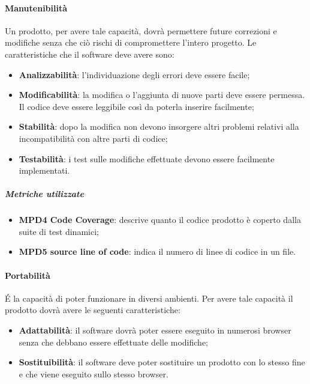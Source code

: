 \paragraph{Manutenibilità}
Un prodotto, per avere tale capacità, dovrà permettere future correzioni e modifiche senza che ciò rischi di compromettere l'intero progetto. Le caratteristiche che il software deve avere sono:
\begin{itemize}
\item \textbf{Analizzabilità}: l'individuazione degli errori deve essere facile;
\item \textbf{Modificabilità}: la modifica o l'aggiunta di nuove parti deve essere permessa. Il codice deve essere leggibile così da poterla inserire facilmente;
\item \textbf{Stabilità}: dopo la modifica non devono insorgere altri problemi relativi alla incompatibilità con altre parti di codice;
\item \textbf{Testabilità}: i test sulle modifiche effettuate devono essere facilmente implementati.
\end{itemize}
\subparagraph{Metriche utilizzate}
\begin{itemize}
\item \textbf{MPD4 Code Coverage}: descrive quanto il codice prodotto è coperto dalla suite di test dinamici;
\item \textbf{MPD5 source line of code}: indica il numero di linee di codice in un file. 
\end{itemize}
\paragraph{Portabilità}
\'E la capacità di poter funzionare in diversi ambienti. Per avere tale capacità il prodotto dovrà avere le seguenti caratteristiche:
\begin{itemize}
\item \textbf{Adattabilità}: il software dovrà poter essere eseguito in numerosi browser senza che debbano essere effettuate delle modifiche;
\item \textbf{Sostituibilità}: il software deve poter sostituire un prodotto con lo stesso fine e che viene eseguito sullo stesso browser. 
\end{itemize}

